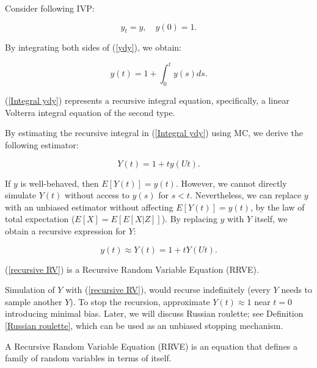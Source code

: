 \documentclass[a4paper,12pt]{article}
\begin{document}
\begin{example}[$y'=y$]
  Consider following IVP:

  \begin{equation} \label{ydy}
    y_t = y, \quad y(0) = 1.
  \end{equation}


  By integrating both sides of (\ref{ydy}), we obtain:

  \begin{equation} \label{Integral ydy}
    y(t) = 1 + \int_{0}^{t} y(s) ds.
  \end{equation}

  (\ref{Integral ydy}) represents a recursive integral equation,
  specifically, a linear Volterra integral equation of the second type.

  By estimating the recursive integral in (\ref{Integral ydy})
  using MC, we derive the following estimator:

  \begin{equation}
    Y(t) = 1 + t  y(Ut).
  \end{equation}


  If $y$ is well-behaved, then $E[Y(t)] = y(t)$.
  However, we cannot directly simulate $Y(t)$ without access
  to $y(s)$ for $s < t$. Nevertheless, we can replace $y$ with
  an unbiased estimator without affecting $E[Y(t)] = y(t)$,
  by the law of total expectation ($E[X] = E[E[X|Z]]$).
  By replacing $y$ with $Y$ itself, we obtain a recursive
  expression for $Y$:

  \begin{equation} \label{recursive RV}
    y(t) \approx Y(t) = 1 + t  Y(Ut).
  \end{equation}


  (\ref{recursive RV}) is a Recursive Random Variable
  Equation (RRVE).

  Simulation of $Y$ with (\ref{recursive RV}),
  would recurse indefinitely (every $Y$ needs to sample another $Y$).
  To stop the recursion, approximate
  $Y(t) \approx 1$ near $t = 0$ introducing minimal bias.
  Later, we will discuss Russian roulette; see Definition \ref{Russian roulette},
  which can be used as an unbiased stopping mechanism.

\end{example}

\begin{definition}
  A Recursive Random Variable Equation (RRVE) is
  an equation that defines a
  family of random variables in terms of itself.
\end{definition}
\end{document}
